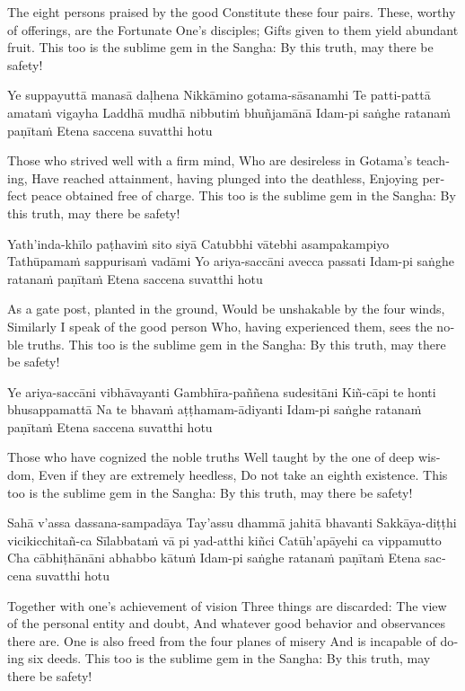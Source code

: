 \begin{english}
\begin{english}
\begin{english}
The eight persons praised by the good
Constitute these four pairs.
These, worthy of offerings, are the Fortunate One’s disciples;
Gifts given to them yield abundant fruit.
This too is the sublime gem in the Sangha:
By this truth, may there be safety!
\end{english}

Ye suppayuttā manasā daḷhena
Nikkāmino gotama-sāsanamhi
Te patti-pattā amataṁ vigayha
Laddhā mudhā nibbutiṁ bhuñjamānā
Idam-pi saṅghe ratanaṁ paṇītaṁ
Etena saccena suvatthi hotu

\begin{english}
Those who strived well with a firm mind,
Who are desireless in Gotama’s teaching,
Have reached attainment, having plunged into the deathless,
Enjoying perfect peace obtained free of charge.
This too is the sublime gem in the Sangha:
By this truth, may there be safety!
\end{english}

Yath’inda-khīlo paṭhaviṁ sito siyā
Catubbhi vātebhi asampakampiyo
Tathūpamaṁ sappurisaṁ vadāmi
Yo ariya-saccāni avecca passati
Idam-pi saṅghe ratanaṁ paṇītaṁ
Etena saccena suvatthi hotu

\begin{english}
As a gate post, planted in the ground,
Would be unshakable by the four winds,
Similarly I speak of the good person
Who, having experienced them, sees the noble truths.
This too is the sublime gem in the Sangha:
By this truth, may there be safety!
\end{english}

Ye ariya-saccāni vibhāvayanti
Gambhīra-paññena sudesitāni
Kiñ-cāpi te honti bhusappamattā
Na te bhavaṁ aṭṭhamam-ādiyanti
Idam-pi saṅghe ratanaṁ paṇītaṁ
Etena saccena suvatthi hotu

\begin{english}
Those who have cognized the noble truths
Well taught by the one of deep wisdom,
Even if they are extremely heedless,
Do not take an eighth existence.
This too is the sublime gem in the Sangha:
By this truth, may there be safety!
\end{english}

Sahā v’assa dassana-sampadāya
Tay’assu dhammā jahitā bhavanti
Sakkāya-diṭṭhi vicikicchitañ-ca
Sīlabbataṁ vā pi yad-atthi kiñci
Catūh’apāyehi ca vippamutto
Cha cābhiṭhānāni abhabbo kātuṁ
Idam-pi saṅghe ratanaṁ paṇītaṁ
Etena saccena suvatthi hotu

\begin{english}
Together with one’s achievement of vision
Three things are discarded:
The view of the personal entity and doubt,
And whatever good behavior and observances there are.
One is also freed from the four planes of misery
And is incapable of doing six deeds.
This too is the sublime gem in the Sangha:
By this truth, may there be safety!
\end{english}


\end{english}
\end{english}
